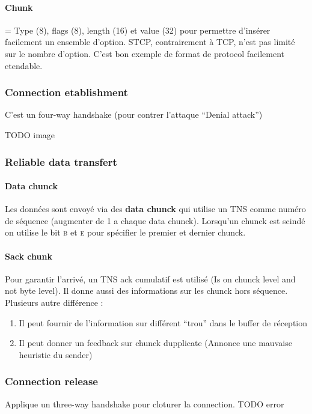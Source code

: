 \paragraph{Chunk} = Type (8), flags (8), length (16) et value (32) pour permettre d'insérer facilement un ensemble d'option. STCP, contrairement à TCP, n'est pas limité sur le nombre d'option. C'est bon exemple de format de protocol facilement etendable.

\subsubsection{Connection etablishment}
C'est un four-way handshake (pour contrer l'attaque ``Denial attack'')

TODO image

\subsubsection{Reliable data transfert}

\paragraph{Data chunck}
Les données sont envoyé via des \textbf{data chunck} qui utilise un TNS comme
numéro de séquence (augmenter de 1 a chaque data chunck). Lorsqu'un chunck est
scindé on utilise le bit \textsc{b} et \textsc{e} pour spécifier le premier et dernier
chunck.

\paragraph{Sack chunk}
Pour garantir l'arrivé, un TNS ack cumulatif est utilisé (Is on chunck level and not
byte level). Il donne aussi des informations sur les chunck hors séquence.
Plusieurs autre différence :
\begin{enumerate}
    \item Il peut fournir de l'information sur différent ``trou'' dans le buffer de réception
    \item Il peut donner un feedback sur chunck dupplicate (Annonce une mauvaise heuristic du sender)
\end{enumerate}

\subsubsection{Connection release}
Applique un three-way handshake pour cloturer la connection.
TODO error

